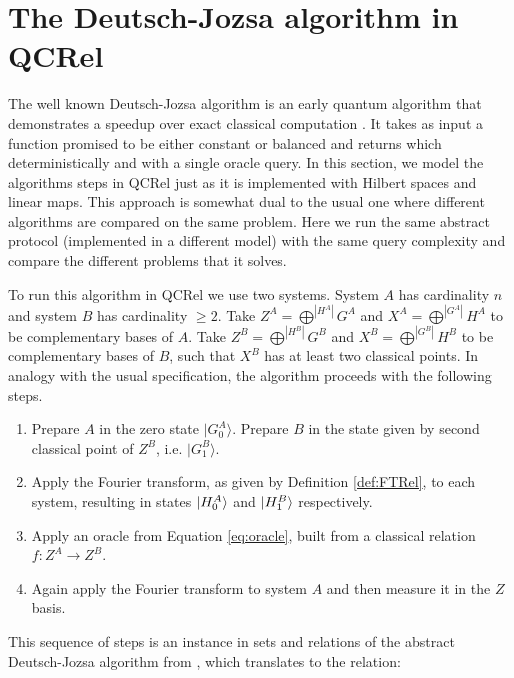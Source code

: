 \section{The Deutsch-Jozsa algorithm in QCRel}

The well known Deutsch-Jozsa algorithm is an early quantum algorithm that demonstrates a speedup over exact classical computation \cite{deutsch1992rapid}. It takes as input a function promised to be either constant or balanced and returns which deterministically and with a single oracle query. In this section, we model the algorithms steps in QCRel just as it is implemented with Hilbert spaces and linear maps. This approach is somewhat dual to the usual one where different algorithms are compared on the same problem. Here we run the same abstract protocol (implemented in a different model) with the same query complexity and compare the different problems that it solves.

To run this algorithm in QCRel we use two systems.  System $A$ has cardinality $n$ and system $B$ has cardinality $\ge 2$. Take $Z^A=\bigoplus^{|H^{A}|}G^A$ and $X^A=\bigoplus^{|G^{A}|}H^A$ to be complementary bases of $A$. Take $Z^B=\bigoplus^{|H^{B}|}G^B$ and $X^B=\bigoplus^{|G^{B}|}H^B$ to be complementary bases of $B$, such that $X^B$ has at least two classical points. In analogy with the usual specification, the algorithm proceeds with the following steps.
\begin{enumerate}
\item Prepare $A$ in the zero state $|G^{A}_0\rangle$. Prepare $B$ in the state given by second classical point of $Z^B$, i.e. $|G^B_1\rangle$.

\item Apply the Fourier transform, as given by Definition \ref{def:FTRel}, to each system, resulting in states $| H_0^A \rangle$ and $| H_1^B \rangle$ respectively.

\item Apply an oracle from Equation \ref{eq:oracle}, built from a classical relation $f:Z^A\to Z^B$.

\item Again apply the Fourier transform to system $A$ and then measure it in the $Z$ basis.
\end{enumerate}

\noindent This sequence of steps is an instance in sets and relations of the abstract Deutsch-Jozsa algorithm from \cite{vicary-tqa}, which translates to the relation:


